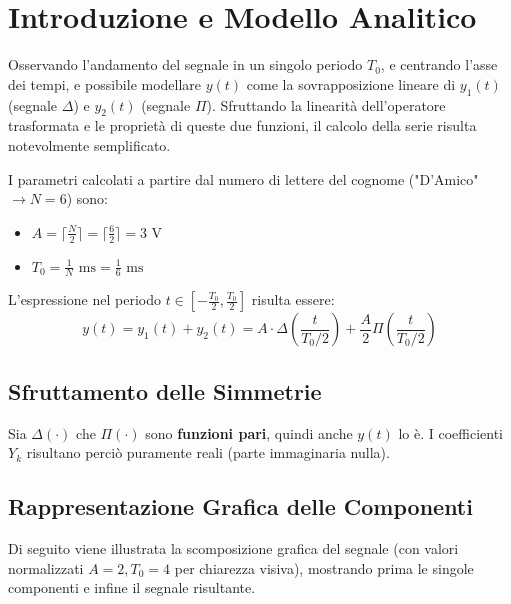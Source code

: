 \section{Introduzione e Modello Analitico}

Osservando l'andamento del segnale in un singolo periodo $T_0$, e centrando l'asse dei tempi, e possibile modellare $y(t)$ come la sovrapposizione lineare di $y_1(t)$ (segnale $\Delta$) e $y_2(t)$ (segnale $\Pi$). Sfruttando la linearità dell'operatore trasformata e le proprietà di queste due funzioni, il calcolo della serie risulta notevolmente semplificato.

I parametri calcolati a partire dal numero di lettere del cognome ("D'Amico" $\rightarrow N=6$) sono:
\begin{itemize}
    \item $A = \lceil \frac{N}{2} \rceil = \lceil \frac{6}{2} \rceil = 3 \text{ V}$
    \item $T_0 = \frac{1}{N} \text{ ms} = \frac{1}{6} \text{ ms}$
\end{itemize}

L'espressione nel periodo $t \in \left[-\frac{T_0}{2}, \frac{T_0}{2}\right]$ risulta essere:
\begin{equation}
    y(t) = y_1(t) + y_2(t) = A \cdot \Delta\left(\frac{t}{T_0/2}\right) + \frac{A}{2} \Pi\left(\frac{t}{T_0/2}\right)
\end{equation}

\subsection{Sfruttamento delle Simmetrie}
Sia $\Delta(\cdot)$ che $\Pi(\cdot)$ sono \textbf{funzioni pari}, quindi anche $y(t)$ lo è. I coefficienti $Y_k$ risultano perciò puramente reali (parte immaginaria nulla).

\subsection{Rappresentazione Grafica delle Componenti}
Di seguito viene illustrata la scomposizione grafica del segnale (con valori normalizzati $A=2, T_0=4$ per chiarezza visiva), mostrando prima le singole componenti e infine il segnale risultante.

\vspace{0.5cm}

